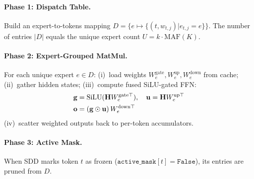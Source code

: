 \documentclass[letterpaper,twocolumn,10pt]{article}
\newcommand{\sdd}{SDD\xspace}
\begin{document}
\paragraph{Phase 1: Dispatch Table.}  Build an expert-to-tokens mapping
$D\!=\!\{e \mapsto \{(t, w_{t,j}) | e_{t,j}\!=\!e\}\}$.  The number of
entries $|D|$ equals the unique expert count $U = k \cdot \text{MAF}(K)$.

\paragraph{Phase 2: Expert-Grouped MatMul.}  For each unique expert
$e \in D$: (i)~load weights $W_e^{\text{gate}}, W_e^{\text{up}},
W_e^{\text{down}}$ from cache; (ii)~gather hidden states; (iii)~compute
fused SiLU-gated FFN:
\begin{align}
  \mathbf{g} &= \text{SiLU}(\mathbf{H} W_e^{\text{gate}\top}),\quad
  \mathbf{u} = \mathbf{H} W_e^{\text{up}\top} \notag\\
  \mathbf{o} &= (\mathbf{g} \odot \mathbf{u})\, W_e^{\text{down}\top}
\end{align}
(iv)~scatter weighted outputs back to per-token accumulators.

\paragraph{Phase 3: Active Mask.}  When \sdd marks token $t$ as frozen
($\texttt{active\_mask}[t]\!=\!\texttt{False}$), its entries are pruned
from $D$.
\end{document}
